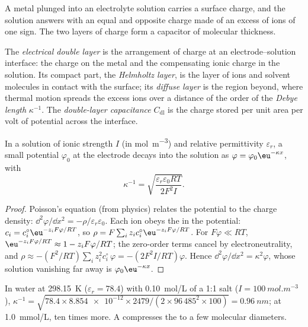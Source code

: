 A metal plunged into an electrolyte solution carries a surface charge, and the
solution answers with an equal and opposite charge made of an excess of ions
of one sign. The two layers of charge form a capacitor of molecular thickness.

\begin{definition}\label{def:b3:electrode-kinetics:double-layer}
The \emph{electrical double layer} is the
arrangement of charge at an electrode--solution interface: the charge on the
metal and the compensating ionic charge in the solution. Its compact part, the
\emph{Helmholtz layer}, is the layer of ions and solvent
molecules in contact with the surface; its \emph{diffuse layer}
is the region beyond, where thermal motion spreads the excess ions over
a distance of the order of the \emph{Debye length} $\kappa^{-1}$. The
\emph{double-layer capacitance} $C_{\mathrm{dl}}$ is the charge
stored per unit area per volt of potential across the interface.
\end{definition}

\begin{proposition}\label{prop:b3:electrode-kinetics:debye-length}
In a solution of ionic strength $I$ (in \unit{mol.m^{-3}}) and relative permittivity
$\varepsilon_r$, a small potential $\varphi_0$ at the electrode decays into the solution as
$\varphi = \varphi_0\eu^{-\kappa x}$, with
\[
  \kappa^{-1} = \sqrt{\frac{\varepsilon_r\varepsilon_0RT}{2F^2I}} .
\]
\end{proposition}

\begin{proof}
Poisson's equation (from physics) relates the potential to the charge density:
$\dd^2\varphi/\dd x^2 = -\rho/\varepsilon_r\varepsilon_0$. Each ion obeys the  in the
potential: $c_i = c_i^{\circ}\eu^{-z_iF\varphi/RT}$, so $\rho = F\sum_iz_ic_i^{\circ}\eu^{-z_iF\varphi/RT}$. For $F\varphi \ll RT$,
$\eu^{-z_iF\varphi/RT} \approx 1 - z_iF\varphi/RT$; the zero-order terms cancel by electroneutrality,
and $\rho \approx -(F^2/RT)\sum_iz_i^2c_i^{\circ}\,\varphi = -(2F^2I/RT)\varphi$. Hence $\dd^2\varphi/\dd x^2 = \kappa^2\varphi$, whose
solution vanishing far away is $\varphi_0\eu^{-\kappa x}$.
\end{proof}

\begin{example}\label{ex:b3:electrode-kinetics:debye}
In water at \qty{298.15}{K} ($\varepsilon_r = 78.4$) with \qty{0.10}{mol/L} of a 1:1 salt ($I = \qty{100}{mol.m^{-3}}$),
$\kappa^{-1} = \sqrt{78.4 \times \num{8.854e-12} \times 2479/(2 \times 96\,485^2 \times 100)} = \qty{0.96}{nm}$; at \qty{1.0}{mmol/L},
ten times more. A  compresses the  to a few
molecular diameters.
\end{example}

